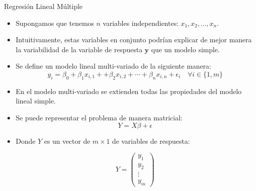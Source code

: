 \documentclass[handout]{beamer}
\begin{document}
\begin{frame}{Regresión Lineal Múltiple}
\scriptsize{
\begin{itemize}
 \item Supongamos que tenemos $n$ variables independientes: $x_1,x_2,\dots,x_n$.
 \item Intuitivamente, estas variables en conjunto podrían explicar de mejor manera la variabilidad de la variable de respuesta $\mathbf{y}$ que un modelo simple.
 \item Se define un modelo lineal multi-variado de la siguiente manera:
 \begin{displaymath}
 y_i=\beta_{0}+\beta_{1}x_{i,1}+ +\beta_{2}x_{i,2} + \cdots + \beta_{n}x_{i,n} +  \epsilon_i \quad \forall i \in \{1,m\}
\end{displaymath}
\item En el modelo multi-variado se extienden todas las propiedades del modelo lineal simple.

\item Se puede representar el problema de manera matricial:
\begin{displaymath}
 Y=X\beta+\epsilon
\end{displaymath}

\item Donde $Y$ es un vector de $m\times 1$ de variables de respuesta:

\begin{displaymath}
 Y =
 \begin{pmatrix}
  y_{1} \\
  y_{2}  \\
  \vdots  \\
  y_{m}
 \end{pmatrix}
\end{displaymath}






\end{itemize}
 

}
\end{frame}
\end{document}
